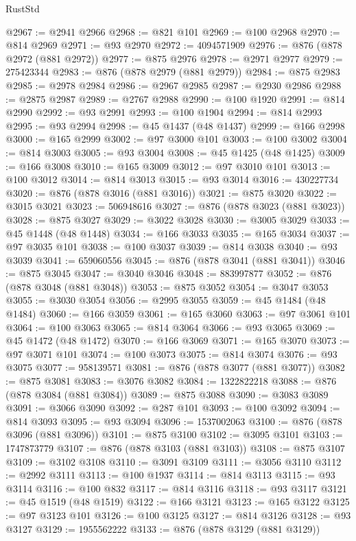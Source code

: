 \begin{lexlean}{RustStd}
\begin{coremodule}
@2967 := @2941 @2966
@2968 := @821 @101
@2969 := @100 @2968
@2970 := @814 @2969
@2971 := @93 @2970
@2972 := 4094571909
@2976 := @876 (@878 @2972 (@881 @2972))
@2977 := @875 @2976
@2978 := @2971 @2977
@2979 := 275423344
@2983 := @876 (@878 @2979 (@881 @2979))
@2984 := @875 @2983
@2985 := @2978 @2984
@2986 := @2967 @2985
@2987 := @2930 @2986
@2988 := @2875 @2987
@2989 := @2767 @2988
@2990 := @100 @1920
@2991 := @814 @2990
@2992 := @93 @2991
@2993 := @100 @1904
@2994 := @814 @2993
@2995 := @93 @2994
@2998 := @45 @1437 (@48 @1437)
@2999 := @166 @2998
@3000 := @165 @2999
@3002 := @97 @3000 @101
@3003 := @100 @3002
@3004 := @814 @3003
@3005 := @93 @3004
@3008 := @45 @1425 (@48 @1425)
@3009 := @166 @3008
@3010 := @165 @3009
@3012 := @97 @3010 @101
@3013 := @100 @3012
@3014 := @814 @3013
@3015 := @93 @3014
@3016 := 430227734
@3020 := @876 (@878 @3016 (@881 @3016))
@3021 := @875 @3020
@3022 := @3015 @3021
@3023 := 506948616
@3027 := @876 (@878 @3023 (@881 @3023))
@3028 := @875 @3027
@3029 := @3022 @3028
@3030 := @3005 @3029
@3033 := @45 @1448 (@48 @1448)
@3034 := @166 @3033
@3035 := @165 @3034
@3037 := @97 @3035 @101
@3038 := @100 @3037
@3039 := @814 @3038
@3040 := @93 @3039
@3041 := 659060556
@3045 := @876 (@878 @3041 (@881 @3041))
@3046 := @875 @3045
@3047 := @3040 @3046
@3048 := 883997877
@3052 := @876 (@878 @3048 (@881 @3048))
@3053 := @875 @3052
@3054 := @3047 @3053
@3055 := @3030 @3054
@3056 := @2995 @3055
@3059 := @45 @1484 (@48 @1484)
@3060 := @166 @3059
@3061 := @165 @3060
@3063 := @97 @3061 @101
@3064 := @100 @3063
@3065 := @814 @3064
@3066 := @93 @3065
@3069 := @45 @1472 (@48 @1472)
@3070 := @166 @3069
@3071 := @165 @3070
@3073 := @97 @3071 @101
@3074 := @100 @3073
@3075 := @814 @3074
@3076 := @93 @3075
@3077 := 958139571
@3081 := @876 (@878 @3077 (@881 @3077))
@3082 := @875 @3081
@3083 := @3076 @3082
@3084 := 1322822218
@3088 := @876 (@878 @3084 (@881 @3084))
@3089 := @875 @3088
@3090 := @3083 @3089
@3091 := @3066 @3090
@3092 := @287 @101
@3093 := @100 @3092
@3094 := @814 @3093
@3095 := @93 @3094
@3096 := 1537002063
@3100 := @876 (@878 @3096 (@881 @3096))
@3101 := @875 @3100
@3102 := @3095 @3101
@3103 := 1747873779
@3107 := @876 (@878 @3103 (@881 @3103))
@3108 := @875 @3107
@3109 := @3102 @3108
@3110 := @3091 @3109
@3111 := @3056 @3110
@3112 := @2992 @3111
@3113 := @100 @1937
@3114 := @814 @3113
@3115 := @93 @3114
@3116 := @100 @832
@3117 := @814 @3116
@3118 := @93 @3117
@3121 := @45 @1519 (@48 @1519)
@3122 := @166 @3121
@3123 := @165 @3122
@3125 := @97 @3123 @101
@3126 := @100 @3125
@3127 := @814 @3126
@3128 := @93 @3127
@3129 := 1955562222
@3133 := @876 (@878 @3129 (@881 @3129))

\end{coremodule}
\end{lexlean}
